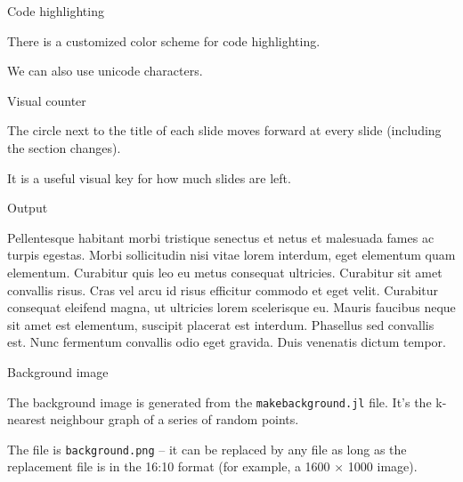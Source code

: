 \documentclass[11pt, compress, aspectratio=1610]{beamer}
\newenvironment{Shaded}{\begin{mdframed}}{\end{mdframed}}
\newcommand{\KeywordTok}[1]{\textcolor[rgb]{0.26,0.66,0.93}{\textbf{{#1}}}}
\newcommand{\FloatTok}[1]{\textcolor[HTML]{558B2F}{{#1}}}
\newcommand{\CharTok}[1]{\textcolor[HTML]{7E57C2}{{#1}}}
\newcommand{\StringTok}[1]{\textcolor[HTML]{7E57C2}{{#1}}}
\newcommand{\CommentTok}[1]{\textcolor[HTML]{8D6E63}{\textit{{#1}}}}
\newcommand{\NormalTok}[1]{\textcolor[HTML]{212121}{{#1}}}
\let\OldTexttt\texttt
\renewcommand{\texttt}[1]{\OldTexttt{\color{plTT}#1}}
\begin{document}
\begin{frame}[fragile]{Code highlighting}

There is a customized color scheme for code highlighting.

\begin{Shaded}
\end{Shaded}

We can also use \alert{unicode characters}.

\end{frame}

\begin{frame}{Visual counter}

The circle next to the title of each slide moves forward at every slide
(including the section changes).

It is a useful visual key for how much slides are left.

\end{frame}

\begin{frame}{Output}

Pellentesque habitant morbi tristique senectus et netus et malesuada
fames ac turpis egestas. Morbi sollicitudin nisi vitae lorem interdum,
eget elementum quam elementum. Curabitur quis leo eu metus consequat
ultricies. Curabitur sit amet convallis risus. Cras vel arcu id risus
efficitur commodo et eget velit. Curabitur consequat eleifend magna, ut
ultricies lorem scelerisque eu. Mauris faucibus neque sit amet est
elementum, suscipit placerat est interdum. Phasellus sed convallis est.
Nunc fermentum convallis odio eget gravida. Duis venenatis dictum
tempor.

\end{frame}

\begin{frame}[fragile]{Background image}

The background image is generated from the \texttt{makebackground.jl}
file. It's the k-nearest neighbour graph of a series of random points.

The file is \texttt{background.png} -- it can be replaced by any file
\alert{as long
as} the replacement file is in the 16:10 format (for example, a 1600
\(\times\) 1000 image).

\end{frame}
\end{document}
